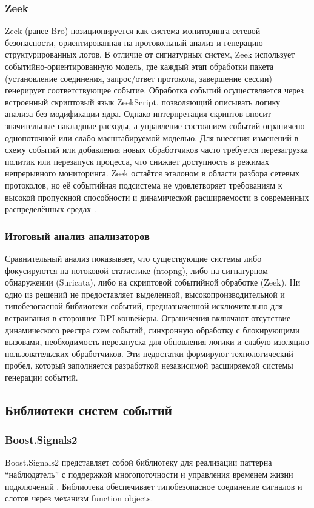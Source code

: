 \subsubsection{Zeek}
Zeek (ранее Bro) позиционируется как система мониторинга сетевой безопасности, ориентированная на протокольный анализ и генерацию структурированных логов.
В отличие от сигнатурных систем, Zeek использует событийно-ориентированную модель, где каждый этап обработки пакета (установление соединения, запрос/ответ протокола, завершение сессии) генерирует соответствующее событие.
Обработка событий осуществляется через встроенный скриптовый язык ZeekScript, позволяющий описывать логику анализа без модификации ядра.
Однако интерпретация скриптов вносит значительные накладные расходы, а управление состоянием событий ограничено однопоточной или слабо масштабируемой моделью.
Для внесения изменений в схему событий или добавления новых обработчиков часто требуется перезагрузка политик или перезапуск процесса, что снижает доступность в режимах непрерывного мониторинга.
Zeek остаётся эталоном в области разбора сетевых протоколов, но её событийная подсистема не удовлетворяет требованиям к высокой пропускной способности и динамической расширяемости в современных распределённых средах \cite{zeek2022design}.

\subsubsection{Итоговый анализ анализаторов}
Сравнительный анализ показывает, что существующие системы либо фокусируются на потоковой статистике (ntopng), либо на сигнатурном обнаружении (Suricata), либо на скриптовой событийной обработке (Zeek).
Ни одно из решений не предоставляет выделенной, высокопроизводительной и типобезопасной библиотеки событий, предназначенной исключительно для встраивания в сторонние DPI-конвейеры.
Ограничения включают отсутствие динамического реестра схем событий, синхронную обработку с блокирующими вызовами, необходимость перезапуска для обновления логики и слабую изоляцию пользовательских обработчиков.
Эти недостатки формируют технологический пробел, который заполняется разработкой независимой расширяемой системы генерации событий.

\subsection{Библиотеки систем событий}
\subsubsection{Boost.Signals2}
Boost.Signals2 представляет собой библиотеку для реализации паттерна ``наблюдатель'' с поддержкой многопоточности и управления временем жизни подключений \cite{boost2023signal}.
Библиотека обеспечивает типобезопасное соединение сигналов и слотов через механизм function objects.

